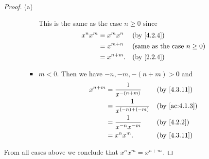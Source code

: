 \begin{proof}{(a)}
\begin{itemize}
\begin{itemize}
\begin{itemize}
                          This is the same as the case \(n \geq 0\) since
                          \begin{align*}
                            x^n x^m & = x^m x^n    &  & \by{4.2.4}                             \\
                                    & = x^{m + n}  &  & \text{(same as the case \(n \geq 0\))} \\
                                    & = x^{n + m}. &  & \by{2.2.4}
                          \end{align*}
                    \item \(m < 0\).
                          Then we have \(-n, -m, -(n + m) > 0\) and
                          \begin{align*}
                            x^{n + m} & = \dfrac{1}{x^{-(n + m)}}    &  & \text{(by \cref{4.3.11})}   \\
                                      & = \dfrac{1}{x^{(-n) + (-m)}} &  & \text{(by \cref{ac:4.1.3})} \\
                                      & = \dfrac{1}{x^{-n} x^{-m}}   &  & \by{4.2.2}                  \\
                                      & = x^n x^m.                   &  & \text{(by \cref{4.3.11})}
                          \end{align*}
                  \end{itemize}
          \end{itemize}
  \end{itemize}
  From all cases above we conclude that \(x^n x^m = x^{n + m}\).


\end{proof}
